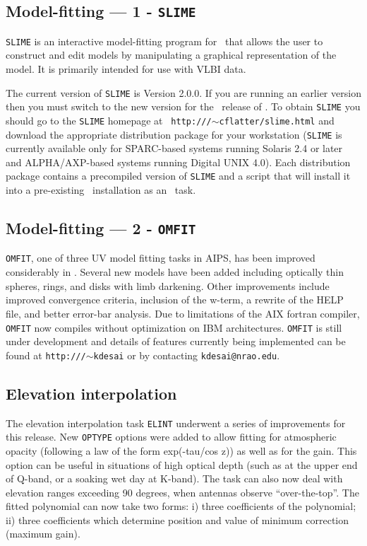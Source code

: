 \subsection{Model-fitting --- 1 - {\tt SLIME}}

{\tt SLIME} is an interactive model-fitting program for \AIPS\ that
allows the user to construct and edit models by manipulating a
graphical representation of the model.  It is primarily intended for
use with VLBI data.

The current version of {\tt SLIME} is Version 2.0.0.  If you are
running an earlier version then you must switch to the new version for
the \RELEASENAME\ release of \AIPS.  To obtain {\tt SLIME} you should
go to the {\tt SLIME} homepage at {\tt
http://\www/$\sim$cflatter/slime.html} and download the appropriate
distribution package for your workstation ({\tt SLIME} is currently
available only for SPARC-based systems running Solaris 2.4 or later
and ALPHA/AXP-based systems running Digital UNIX 4.0).  Each
distribution package contains a precompiled version of {\tt SLIME} and
a script that will install it into a pre-existing \AIPS\ installation
as an \AIPS\ task.

\subsection{Model-fitting --- 2 - {\tt OMFIT}}

{\tt OMFIT}, one of three UV model fitting tasks in AIPS, has been
improved considerably in \RELEASENAME.  Several new models have been
added including optically thin spheres, rings, and disks with limb
darkening.  Other improvements include improved convergence criteria,
inclusion of the w-term, a rewrite of the HELP file, and better
error-bar analysis.  Due to limitations of the AIX fortran compiler,
{\tt OMFIT} now compiles without optimization on IBM architectures.
{\tt OMFIT} is still under development and details of features
currently being implemented can be found at {\tt http://\www/$\sim$kdesai}
or by contacting {\tt kdesai@nrao.edu}.


\subsection{Elevation interpolation}

The elevation interpolation task {\tt ELINT} underwent a series of
improvements for this release.  New {\tt OPTYPE} options were added to
allow fitting for atmospheric opacity (following a law of the form
exp(-tau/cos z)) as well as for the gain.  This option can be useful
in situations of high optical depth (such as at the upper end of
Q-band, or a soaking wet day at K-band). The task can also now deal
with elevation ranges exceeding 90 degrees, when antennas observe
``over-the-top''.  The fitted polynomial can now take two forms: i)
three coefficients of the polynomial; ii) three coefficients which
determine position and value of minimum correction (maximum gain).

